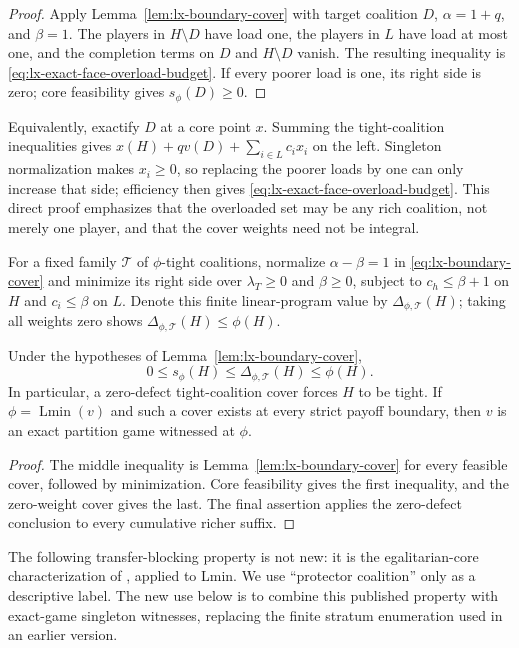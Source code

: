 \begin{proof}
Apply Lemma~\ref{lem:lx-boundary-cover} with target coalition $D$,
$\alpha=1+q$, and $\beta=1$.  The players in $H\setminus D$ have load one,
the players in $L$ have load at most one, and the completion terms on $D$
and $H\setminus D$ vanish.  The resulting inequality is
\eqref{eq:lx-exact-face-overload-budget}.  If every poorer load is one, its
right side is zero; core feasibility gives $s_\phi(D)\geq0$.
\end{proof}

Equivalently, exactify $D$ at a core point $x$.  Summing the tight-coalition
inequalities gives $x(H)+qv(D)+\sum_{i\in L}c_ix_i$ on the left.  Singleton
normalization makes $x_i\geq0$, so replacing the poorer loads by one can
only increase that side; efficiency then gives
\eqref{eq:lx-exact-face-overload-budget}.  This direct proof emphasizes that
the overloaded set may be any rich coalition, not merely one player, and
that the cover weights need not be integral.

For a fixed family $\mathcal T$ of $\phi$-tight coalitions, normalize
$\alpha-\beta=1$ in \eqref{eq:lx-boundary-cover} and minimize its right side
over $\lambda_T\geq0$ and $\beta\geq0$, subject to
$c_h\leq\beta+1$ on $H$ and $c_i\leq\beta$ on $L$.  Denote this finite
linear-program value by $\Delta_{\phi,\mathcal T}(H)$; taking all weights zero
shows $\Delta_{\phi,\mathcal T}(H)\leq\phi(H)$.

\begin{corollary}
\label{cor:lx-boundary-defect}
Under the hypotheses of Lemma~\ref{lem:lx-boundary-cover},
\[
 0\leq s_\phi(H)\leq\Delta_{\phi,\mathcal T}(H)\leq\phi(H).
 \tag{BD}\label{eq:lx-boundary-defect}
\]
In particular, a zero-defect tight-coalition cover forces $H$ to be tight.
If $\phi=\operatorname{Lmin}(v)$ and such a cover exists at every strict
payoff boundary, then $v$ is an exact partition game witnessed at $\phi$.
\end{corollary}

\begin{proof}
The middle inequality is Lemma~\ref{lem:lx-boundary-cover} for every feasible
cover, followed by minimization.  Core feasibility gives the first inequality,
and the zero-weight cover gives the last.  The final assertion applies the
zero-defect conclusion to every cumulative richer suffix.
\end{proof}

The following transfer-blocking property is not new: it is the
egalitarian-core characterization of \citet{ArinInarra2001}, applied to Lmin.
We use ``protector coalition'' only as a descriptive label.  The new use below
is to combine this published property with exact-game singleton witnesses,
replacing the finite stratum enumeration used in an earlier version.

